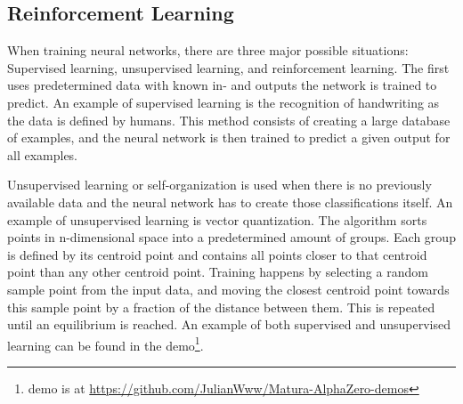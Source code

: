 \documentclass[12pt]{article}
\begin{document}
\subsection{Reinforcement Learning}
When training neural networks, there are three major possible situations: Supervised learning, unsupervised learning, and reinforcement learning. The first uses predetermined data with known in- and outputs the network is trained to predict. An example of supervised learning is the recognition of handwriting as the data is defined by humans. This method consists of creating a large database of examples, and the neural network is then trained to predict a given output for all examples. 

Unsupervised learning or self-organization is used when there is no previously available data and the neural network has to create those classifications itself. An example of unsupervised learning is vector quantization. The algorithm sorts points in n-dimensional space into a predetermined amount of groups. Each group is defined by its centroid point and contains all points closer to that centroid point than any other centroid point. Training happens by selecting a random sample point from the input data, and moving the closest centroid point towards this sample point by a fraction of the distance between them.\cite{wiki:Vector_quantization} This is repeated until an equilibrium is reached. An example of both supervised and unsupervised learning can be found in the demo\footnote{demo is at \url{https://github.com/JulianWww/Matura-AlphaZero-demos}}.
\end{document}
